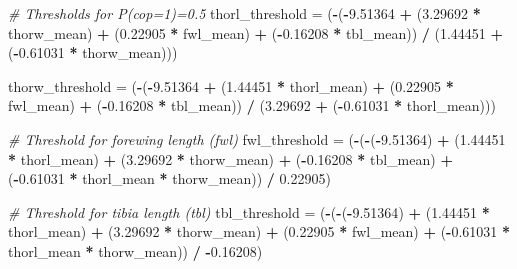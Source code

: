 \documentclass[
]{article}
\newenvironment{Shaded}{\begin{snugshade}}{\end{snugshade}}
\newcommand{\CommentTok}[1]{\textcolor[rgb]{0.56,0.35,0.01}{\textit{#1}}}
\newcommand{\FloatTok}[1]{\textcolor[rgb]{0.00,0.00,0.81}{#1}}
\newcommand{\NormalTok}[1]{#1}
\newcommand{\OtherTok}[1]{\textcolor[rgb]{0.56,0.35,0.01}{#1}}
\newcommand{\SpecialCharTok}[1]{\textcolor[rgb]{0.81,0.36,0.00}{\textbf{#1}}}
\begin{document}
\begin{Shaded}
\begin{Highlighting}[]
\CommentTok{\# Thresholds for P(cop=1)=0.5}
\NormalTok{thorl\_threshold }\OtherTok{=}\NormalTok{ (}\SpecialCharTok{{-}}\NormalTok{(}\SpecialCharTok{{-}}\FloatTok{9.51364} \SpecialCharTok{+}\NormalTok{ (}\FloatTok{3.29692} \SpecialCharTok{*}\NormalTok{ thorw\_mean) }\SpecialCharTok{+} 
\NormalTok{                     (}\FloatTok{0.22905} \SpecialCharTok{*}\NormalTok{ fwl\_mean) }\SpecialCharTok{+} 
\NormalTok{                     (}\SpecialCharTok{{-}}\FloatTok{0.16208} \SpecialCharTok{*}\NormalTok{ tbl\_mean)) }\SpecialCharTok{/} 
\NormalTok{                   (}\FloatTok{1.44451} \SpecialCharTok{+}\NormalTok{ (}\SpecialCharTok{{-}}\FloatTok{0.61031} \SpecialCharTok{*}\NormalTok{ thorw\_mean)))}

\NormalTok{thorw\_threshold }\OtherTok{=}\NormalTok{ (}\SpecialCharTok{{-}}\NormalTok{(}\SpecialCharTok{{-}}\FloatTok{9.51364} \SpecialCharTok{+}\NormalTok{ (}\FloatTok{1.44451} \SpecialCharTok{*}\NormalTok{ thorl\_mean) }\SpecialCharTok{+} 
\NormalTok{                     (}\FloatTok{0.22905} \SpecialCharTok{*}\NormalTok{ fwl\_mean) }\SpecialCharTok{+} 
\NormalTok{                     (}\SpecialCharTok{{-}}\FloatTok{0.16208} \SpecialCharTok{*}\NormalTok{ tbl\_mean)) }\SpecialCharTok{/} 
\NormalTok{                   (}\FloatTok{3.29692} \SpecialCharTok{+}\NormalTok{ (}\SpecialCharTok{{-}}\FloatTok{0.61031} \SpecialCharTok{*}\NormalTok{ thorl\_mean)))}

\CommentTok{\# Threshold for forewing length (fwl)}
\NormalTok{fwl\_threshold }\OtherTok{=}\NormalTok{ (}\SpecialCharTok{{-}}\NormalTok{(}\SpecialCharTok{{-}}\NormalTok{(}\SpecialCharTok{{-}}\FloatTok{9.51364}\NormalTok{) }\SpecialCharTok{+} 
\NormalTok{                    (}\FloatTok{1.44451} \SpecialCharTok{*}\NormalTok{ thorl\_mean) }\SpecialCharTok{+} 
\NormalTok{                    (}\FloatTok{3.29692} \SpecialCharTok{*}\NormalTok{ thorw\_mean) }\SpecialCharTok{+} 
\NormalTok{                    (}\SpecialCharTok{{-}}\FloatTok{0.16208} \SpecialCharTok{*}\NormalTok{ tbl\_mean) }\SpecialCharTok{+} 
\NormalTok{                    (}\SpecialCharTok{{-}}\FloatTok{0.61031} \SpecialCharTok{*}\NormalTok{ thorl\_mean }\SpecialCharTok{*}\NormalTok{ thorw\_mean)) }\SpecialCharTok{/} 
                  \FloatTok{0.22905}\NormalTok{)}

\CommentTok{\# Threshold for tibia length (tbl)}
\NormalTok{tbl\_threshold }\OtherTok{=}\NormalTok{ (}\SpecialCharTok{{-}}\NormalTok{(}\SpecialCharTok{{-}}\NormalTok{(}\SpecialCharTok{{-}}\FloatTok{9.51364}\NormalTok{) }\SpecialCharTok{+} 
\NormalTok{                    (}\FloatTok{1.44451} \SpecialCharTok{*}\NormalTok{ thorl\_mean) }\SpecialCharTok{+} 
\NormalTok{                    (}\FloatTok{3.29692} \SpecialCharTok{*}\NormalTok{ thorw\_mean) }\SpecialCharTok{+} 
\NormalTok{                    (}\FloatTok{0.22905} \SpecialCharTok{*}\NormalTok{ fwl\_mean) }\SpecialCharTok{+} 
\NormalTok{                    (}\SpecialCharTok{{-}}\FloatTok{0.61031} \SpecialCharTok{*}\NormalTok{ thorl\_mean }\SpecialCharTok{*}\NormalTok{ thorw\_mean)) }\SpecialCharTok{/} 
                  \SpecialCharTok{{-}}\FloatTok{0.16208}\NormalTok{)}


\end{Highlighting}
\end{Shaded}
\end{document}
